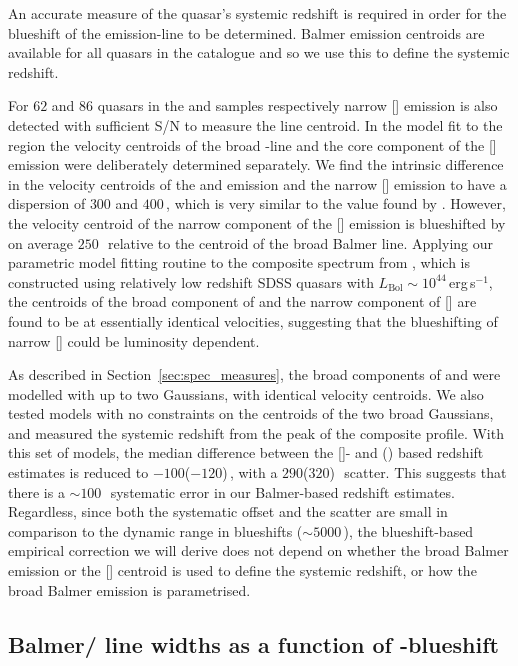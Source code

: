 An accurate measure of the quasar's systemic redshift is required in order for the blueshift of the  emission-line to be determined.
Balmer emission centroids are available for all quasars in the catalogue and so we use this to define the systemic redshift.

For $62$ and $86$ quasars in the \ha and \hb samples respectively narrow [] emission is also detected with sufficient S/N to measure the line centroid. 
In the model fit to the \hb region the velocity centroids of the broad \hbns-line and the core component of the [] emission were deliberately determined separately.
We find the intrinsic difference in the velocity centroids of the \ha and \hb emission and the narrow [] emission to have a dispersion of $300$ and $400$\,\kms, which is very similar to the value found by \citet{shen16b}. 
However, the velocity centroid of the narrow component of the [] emission is blueshifted by on average $250$\,\kms\, relative to the centroid of the broad Balmer line. 
Applying our parametric model fitting routine to the composite spectrum from \citet{hewett10}, which is constructed using relatively low redshift SDSS quasars with $L_{\text{Bol}}\sim10^{44}$\,erg\,s$^{-1}$, the centroids of the broad component of \hb and the narrow component of [] are found to be at essentially identical velocities, suggesting that the blueshifting of narrow [] could be luminosity dependent.

As described in Section~\ref{sec:spec_measures}, the broad components of \ha and \hb were modelled with up to two Gaussians, with identical velocity centroids. 
We also tested models with no constraints on the centroids of the two broad Gaussians, and measured the systemic redshift from the peak of the composite profile. 
With this set of models, the median difference between the []- and \hans(\hbns) based redshift estimates is reduced to $-100$($-120$)\,\kms, with a $290$($320$)\,\kms\, scatter. 
This suggests that there is a $\sim100$\,\kms\, systematic error in our Balmer-based redshift estimates. 
Regardless, since both the systematic offset and the scatter are small in comparison to the dynamic range in  blueshifts ($\sim5000$\,\kms), the blueshift-based empirical correction we will derive does not depend on whether the broad Balmer emission or the [] centroid is used to define the systemic redshift, or how the broad Balmer emission is parametrised. 

\subsection{Balmer/ line widths as a function of -blueshift}
\label{sec:correction}


